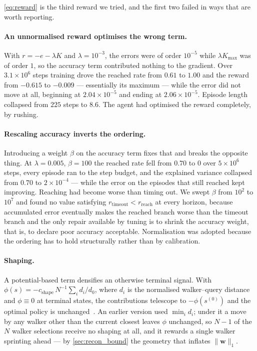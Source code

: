 \eqref{eq:reward} is the third reward we tried, and the first two failed in
ways that are worth reporting.

\paragraph{An unnormalised reward optimises the wrong term.}
With $r = -e - \lambda K$ and $\lambda = 10^{-3}$, the errors were of order
$10^{-5}$ while $\lambda K_{\max}$ was of order $1$, so the accuracy term
contributed nothing to the gradient. Over $3.1\times10^{6}$ steps training
drove the reached rate from $0.61$ to $1.00$ and the reward from $-0.615$ to
$-0.009$ --- essentially its maximum --- while the error did not move at all,
beginning at $2.04\times10^{-5}$ and ending at $2.06\times10^{-5}$. Episode
length collapsed from $225$ steps to $8.6$. The agent had optimised the reward
completely, by rushing.

\paragraph{Rescaling accuracy inverts the ordering.}
Introducing a weight $\beta$ on the accuracy term fixes that and breaks the
opposite thing. At $\lambda = 0.005$, $\beta = 100$ the reached rate fell from
$0.70$ to $0$ over $5\times10^{6}$ steps, every episode ran to the step budget,
and the explained variance collapsed from $0.70$ to $2\times10^{-4}$ --- while
the error on the episodes that still reached kept improving. Reaching had
become worse than timing out. We swept $\beta$ from $10^{2}$ to $10^{7}$ and
found no value satisfying $r_{\mathrm{timeout}} < r_{\mathrm{reach}}$ at every
horizon, because accumulated error eventually makes the reached branch worse
than the timeout branch and the only repair available by tuning is to shrink
the accuracy weight, that is, to declare poor accuracy acceptable.
Normalisation was adopted because the ordering has to hold structurally rather
than by calibration.

\paragraph{Shaping.}
A potential-based term densifies an otherwise terminal signal. With
$\phi(s) = -c_{\mathrm{shape}}\,N^{-1}\sum_i d_i/d_0$, where $d_i$ is the
normalised walker--query distance and $\phi \equiv 0$ at terminal states, the
contributions telescope to $-\phi(s^{(0)})$ and the optimal policy is
unchanged~\cite{ng1999policy}. An earlier version used $\min_i d_i$; under it a
move by any walker other than the current closest leaves $\phi$ unchanged, so
$N-1$ of the $N$ walker selections receive no shaping at all, and it rewards a
single walker sprinting ahead --- by \cref{sec:recon_bound} the geometry that
inflates $\|\mathbf{w}\|_1$.

